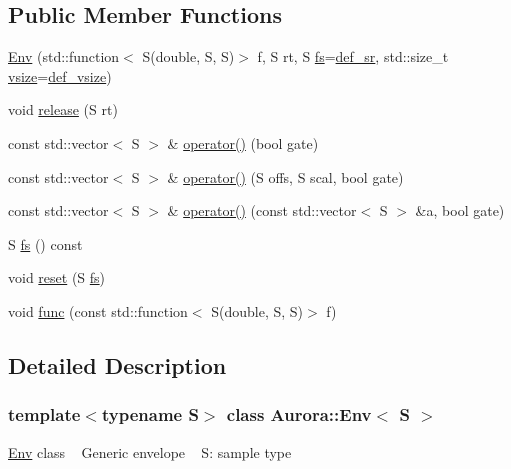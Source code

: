 \subsection*{Public Member Functions}
\begin{DoxyCompactItemize}
\item 
\hyperlink{class_aurora_1_1_env_a2ea7f7db3541bd36853d66423ee74b78}{Env} (std\+::function$<$ S(double, S, S)$>$ f, S rt, S \hyperlink{class_aurora_1_1_env_a82aa0806fae0fac3e527f30b4c2fccc1}{fs}=\hyperlink{namespace_aurora_ad49263d809bea98dd422e95bc91bc03e}{def\+\_\+sr}, std\+::size\+\_\+t \hyperlink{class_aurora_1_1_snd_base_af9e21aaf411b17f7a8221c991ce5d291}{vsize}=\hyperlink{namespace_aurora_afaaddf667a06e7ce23c667a8b7295263}{def\+\_\+vsize})
\item 
void \hyperlink{class_aurora_1_1_env_a6591658018e04100709018bc86e94f31}{release} (S rt)
\item 
const std\+::vector$<$ S $>$ \& \hyperlink{class_aurora_1_1_env_a44666f7414faf21c568d20655d5e2761}{operator()} (bool gate)
\item 
const std\+::vector$<$ S $>$ \& \hyperlink{class_aurora_1_1_env_a2cf905d912ec6089b42922a92d4d7d5e}{operator()} (S offs, S scal, bool gate)
\item 
const std\+::vector$<$ S $>$ \& \hyperlink{class_aurora_1_1_env_a2a97a7e7211a8717957fd0f6f8afc81f}{operator()} (const std\+::vector$<$ S $>$ \&a, bool gate)
\item 
S \hyperlink{class_aurora_1_1_env_a82aa0806fae0fac3e527f30b4c2fccc1}{fs} () const
\item 
void \hyperlink{class_aurora_1_1_env_ac97ef83c828c1ebf2527be51f457eab8}{reset} (S \hyperlink{class_aurora_1_1_env_a82aa0806fae0fac3e527f30b4c2fccc1}{fs})
\item 
void \hyperlink{class_aurora_1_1_env_a0339b4b6d9eab42cbd9e6fd73b34fba7}{func} (const std\+::function$<$ S(double, S, S)$>$ f)
\end{DoxyCompactItemize}


\subsection{Detailed Description}
\subsubsection*{template$<$typename S$>$\newline
class Aurora\+::\+Env$<$ S $>$}

\hyperlink{class_aurora_1_1_env}{Env} class ~\newline
Generic envelope ~\newline
S\+: sample type 

